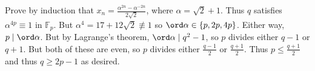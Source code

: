 Prove by induction that $x_n=\frac{\alpha^{2n}-\alpha^{-2n}}{2\sqrt{2}}$, where $\alpha=\sqrt{2}+1$. Thus $q$ satisfies $\alpha^{4p}\equiv1$ in $\mathbb{F}_p$. But $\alpha^4=17+12\sqrt{2}\not\equiv1$ so $\ord\alpha\in\{p,2p,4p\}$. Either way, $p\mid\ord\alpha$. But by Lagrange's theorem, $\ord\alpha\mid q^2-1$, so $p$ divides either $q-1$ or $q+1$. But both of these are even, so $p$ divides either $\frac{q-1}{2}$ or $\frac{q+1}{2}$. Thus $p\leq\frac{q+1}{2}$ and thus $q\geq2p-1$ as desired.